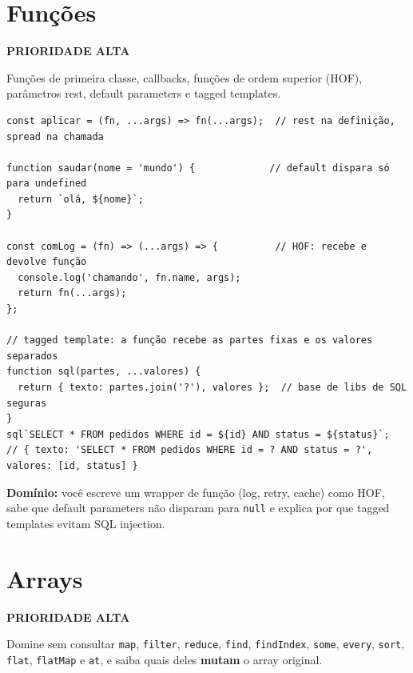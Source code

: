 \documentclass[12pt,a4paper,oneside]{book}
\newcommand{\alta}{\colorbox{red!15}{\sffamily\scriptsize\bfseries PRIORIDADE ALTA}}
\newcommand{\code}[1]{\texttt{#1}}
\newcommand{\dom}[1]{\begin{dominio}\textbf{Domínio:} #1\end{dominio}}
\begin{document}
\section{Funções}
\label{sec:funcoes}
\alta

Funções de primeira classe, callbacks, funções de ordem superior (HOF), parâmetros rest, default parameters e tagged templates.

\begin{verbatim}
const aplicar = (fn, ...args) => fn(...args);  // rest na definição, spread na chamada

function saudar(nome = 'mundo') {             // default dispara só para undefined
  return `olá, ${nome}`;
}

const comLog = (fn) => (...args) => {          // HOF: recebe e devolve função
  console.log('chamando', fn.name, args);
  return fn(...args);
};

// tagged template: a função recebe as partes fixas e os valores separados
function sql(partes, ...valores) {
  return { texto: partes.join('?'), valores };  // base de libs de SQL seguras
}
sql`SELECT * FROM pedidos WHERE id = ${id} AND status = ${status}`;
// { texto: 'SELECT * FROM pedidos WHERE id = ? AND status = ?', valores: [id, status] }
\end{verbatim}

\dom{você escreve um wrapper de função (log, retry, cache) como HOF, sabe que default parameters não disparam para \code{null} e explica por que tagged templates evitam SQL injection.}

\section{Arrays}
\label{sec:arrays}
\alta

Domine sem consultar \code{map}, \code{filter}, \code{reduce}, \code{find}, \code{findIndex}, \code{some}, \code{every}, \code{sort}, \code{flat}, \code{flatMap} e \code{at}, e saiba quais deles \textbf{mutam} o array original.
\end{document}

